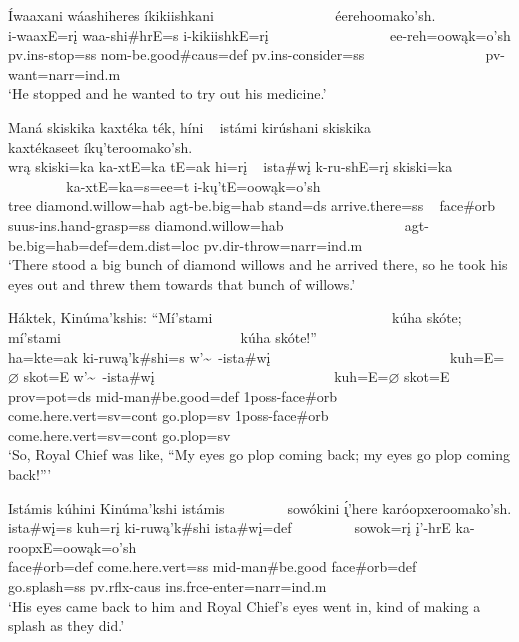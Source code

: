 \begin{exe}
\item\label{EJ43} \glll Íwaaxani wáashiheres íkikiishkani ~ ~ ~ ~ ~ ~ ~ ~ ~ ~ éerehoomako'sh.\\
i-waaxE=rį waa-shi\#hrE=s i-kikiishkE=rį ~ ~ ~ ~ ~ ~ ~ ~ ~ ~ ee-reh=oowąk=o'sh\\
pv.ins-\textnormal{stop}=ss nom-\textnormal{be.good}\#caus=def pv.ins-\textnormal{consider}=ss ~ ~ ~ ~ ~ ~ ~ ~ ~ ~ pv-\textnormal{want}=narr=ind.m\\
\glt `He stopped and he wanted to try out his medicine.'

\item\label{EJ44} \glll Maná skiskika kaxtéka ték, híni ~ istámi kirúshani skiskika ~ ~ ~ ~ ~ ~ ~ ~ ~ ~ kaxtékaseet íkų'teroomako'sh.\\
wrą skiski=ka ka-xtE=ka tE=ak hi=rį ~ ista\#wį k-ru-shE=rį skiski=ka ~ ~ ~ ~ ~ ~ ~ ~ ~ ~ ka-xtE=ka=s=ee=t i-kų'tE=oowąk=o'sh\\
\textnormal{tree} \textnormal{diamond.willow}=hab agt-\textnormal{be.big}=hab \textnormal{stand}=ds \textnormal{arrive.there}=ss ~ \textnormal{face}\#\textnormal{orb} suus-ins.hand-\textnormal{grasp}=ss \textnormal{diamond.willow}=hab ~ ~ ~ ~ ~ ~ ~ ~ ~ ~ agt-\textnormal{be.big}=hab=def=dem.dist=loc pv.dir-\textnormal{throw}=narr=ind.m\\
\glt `There stood a big bunch of diamond willows and he arrived there, so he took his eyes out and threw them towards that bunch of willows.'

\item\label{EJ45} \glll Háktek, Kinúma'kshis: ``Mí'stami ~ ~ ~ ~ ~ ~ ~ ~ ~ ~ ~ ~ ~ ~ ~ kúha skóte; mí'stami ~ ~ ~ ~ ~ ~ ~ ~ ~ ~ ~ ~ ~ ~ ~ kúha skóte!''\\
ha=kte=ak ki-ruwą'k\#shi=s w'\~~-ista\#wį ~ ~ ~ ~ ~  ~ ~ ~ ~ ~ ~ ~ ~ ~ ~ kuh=E=$\varnothing$ skot=E w'\~~-ista\#wį ~ ~ ~ ~ ~ ~ ~ ~ ~ ~ ~ ~ ~ ~ ~ kuh=E=$\varnothing$ skot=E\\
prov=pot=ds mid-\textnormal{man}\#\textnormal{be.good}=def 1poss-\textnormal{face}\#\textnormal{orb} ~ ~ ~ ~ ~ ~ ~ ~ ~ ~ ~ ~ ~ ~ ~ \textnormal{come.here}.vert=sv=cont \textnormal{go.plop}=sv 1poss-\textnormal{face}\#\textnormal{orb} ~ ~ ~ ~ ~ ~ ~ ~ ~ ~ ~ ~ ~ ~ ~ \textnormal{come.here}.vert=sv=cont \textnormal{go.plop}=sv\\
\glt `So, Royal Chief was like, ``My eyes go plop coming back; my eyes go plop coming back!{''}'

\item\label{EJ46} \glll Istámis kúhini Kinúma'kshi istámis ~ ~ ~ ~ ~ sowókini \'{ı̨}'here karóopxeroomako'sh.\\
ista\#wį=s kuh=rį ki-ruwą'k\#shi ista\#wį=def ~ ~ ~ ~ ~ sowok=rį į'-hrE ka-roopxE=oowąk=o'sh\\
\textnormal{face}\#\textnormal{orb}=def \textnormal{come.here}.vert=ss mid-\textnormal{man}\#\textnormal{be.good} \textnormal{face}\#\textnormal{orb}=def ~ ~ ~ ~ ~ \textnormal{go.splash}=ss pv.rflx-caus ins.frce-\textnormal{enter}=narr=ind.m\\
\glt `His eyes came back to him and Royal Chief's eyes went in, kind of making a splash as they did.'


\end{exe}
